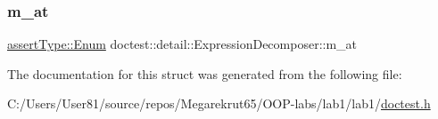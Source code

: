 \subsubsection{\texorpdfstring{m\+\_\+at}{m\_at}}
{\footnotesize\ttfamily \mbox{\hyperlink{namespacedoctest_1_1assert_type_ae1bb5bed722f34f1c38b83cb19d326d3}{assert\+Type\+::\+Enum}} doctest\+::detail\+::\+Expression\+Decomposer\+::m\+\_\+at}



The documentation for this struct was generated from the following file\+:\begin{DoxyCompactItemize}
\item 
C\+:/\+Users/\+User81/source/repos/\+Megarekrut65/\+O\+O\+P-\/labs/lab1/lab1/\mbox{\hyperlink{doctest_8h}{doctest.\+h}}\end{DoxyCompactItemize}

